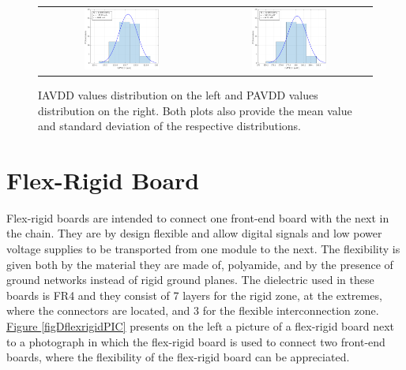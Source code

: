 \begin{figure}[h!]
    \centering
    \begin{tabular}{cc}
        \includegraphics[width=0.475\textwidth]{Images/chap2/results/dummy/AIDD.pdf} & \includegraphics[width=0.475\textwidth]{Images/chap2/results/dummy/APDD.pdf}\\
    \end{tabular}
    \caption{IAVDD values distribution on the left and PAVDD values distribution on the right. Both plots also provide the mean value and standard deviation of the respective distributions.}
    \label{figDUMMYresults}
\end{figure}



\section{Flex-Rigid Board} \label{flexrigids}

Flex-rigid boards are intended to connect one front-end board with the next in the chain. They are by design flexible and allow digital signals and low power voltage supplies to be transported from one module to the next. The flexibility is given both by the material they are made of, polyamide, and by the presence of ground networks instead of rigid ground planes. The dielectric used in these boards is FR4 and they consist of 7 layers for the rigid zone, at the extremes, where the connectors are located, and 3 for the flexible interconnection zone. \hyperref[figDflexrigidPIC]{Figure \ref{figDflexrigidPIC}} presents on the left a picture of a flex-rigid board next to a photograph in which the flex-rigid board is used to connect two front-end boards, where the flexibility of the flex-rigid board can be appreciated.

